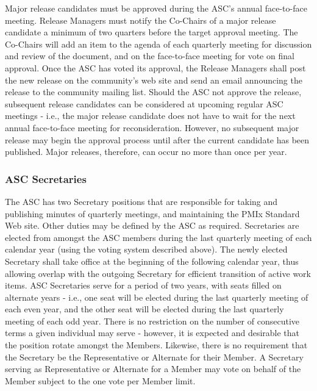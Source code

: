 \documentclass{article}
\begin{document}
Major release candidates must be approved during the ASC's annual
face-to-face meeting. Release Managers must notify the Co-Chairs of a
major release candidate a minimum of two quarters before the target
approval meeting. The Co-Chairs will add an item to the agenda of each
quarterly meeting for discussion and review of the document, and on the
face-to-face meeting for vote on final approval. Once the ASC has voted
its approval, the Release Managers shall post the new release on the
community's web site and send an email announcing the release to the
community mailing list. Should the ASC not approve the release,
subsequent release candidates can be considered at upcoming regular ASC
meetings - i.e., the major release candidate does not have to wait for
the next annual face-to-face meeting for reconsideration. However, no
subsequent major release may begin the approval process until after the
current candidate has been published. Major releases, therefore, can
occur no more than once per year.

\hypertarget{asc-secretaries}{%
\subsubsection{ASC Secretaries}%
\label{asc-secretaries}}

The ASC has two Secretary positions that are responsible for taking and publishing minutes of
quarterly meetings, and maintaining the PMIx Standard Web site. Other
duties may be defined by the ASC as required. Secretaries are elected
from amongst the ASC members during the last quarterly meeting of each
calendar year (using the voting system described above). The newly
elected Secretary shall take office at the beginning of the following
calendar year, thus allowing overlap with the outgoing Secretary for
efficient transition of active work items. ASC Secretaries serve for a
period of two years, with seats filled on alternate years - i.e., one
seat will be elected during the last quarterly meeting of each even
year, and the other seat will be elected during the last quarterly
meeting of each odd year. There is no restriction on the number of
consecutive terms a given individual may serve - however, it is expected
and desirable that the position rotate amongst the Members. Likewise,
there is no requirement that the Secretary be the Representative or
Alternate for their Member. A Secretary serving as Representative or
Alternate for a Member may vote on behalf of the Member subject to the
one vote per Member limit.
\end{document}

